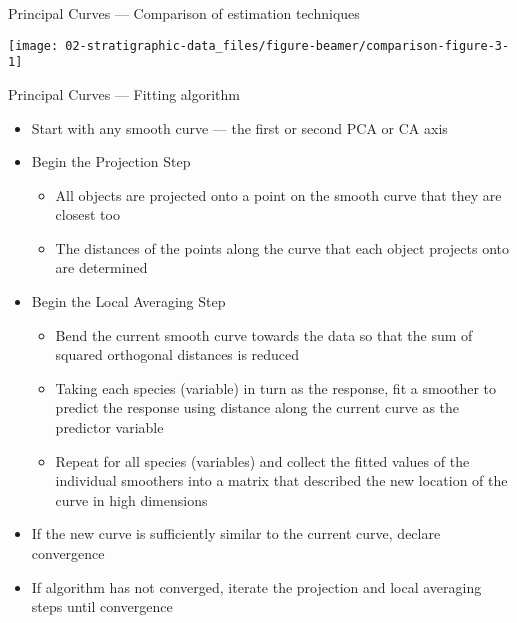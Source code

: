 \documentclass[10pt,ignorenonframetext,compress, aspectratio=169]{beamer}
\providecommand{\tightlist}{%
  \setlength{\itemsep}{0pt}\setlength{\parskip}{0pt}}
\begin{document}
\begin{frame}{Principal Curves --- Comparison of estimation techniques}

\begin{center}\texttt{[image: 02-stratigraphic-data\_files/figure-beamer/comparison-figure-3-1]} \end{center}

\end{frame}

\begin{frame}{Principal Curves --- Fitting algorithm}

\begin{itemize}
\tightlist
\item
  Start with any smooth curve --- the first or second PCA or CA axis
\item
  Begin the \alert{Projection Step}

  \begin{itemize}
  \tightlist
  \item
    All objects are projected onto a point on the smooth curve that they
    are closest too
  \item
    The distances of the points along the curve that each object
    projects onto are determined
  \end{itemize}
\item
  Begin the \alert{Local Averaging Step}

  \begin{itemize}
  \tightlist
  \item
    Bend the current smooth curve towards the data so that the sum of
    squared orthogonal distances is reduced
  \item
    Taking each species (variable) in turn as the response, fit a
    smoother to predict the response using distance along the current
    curve as the predictor variable
  \item
    Repeat for all species (variables) and collect the fitted values of
    the individual smoothers into a matrix that described the new
    location of the curve in high dimensions
  \end{itemize}
\item
  If the new curve is sufficiently similar to the current curve, declare
  convergence
\item
  If algorithm has not converged, iterate the projection and local
  averaging steps until convergence
\end{itemize}

\end{frame}
\end{document}

